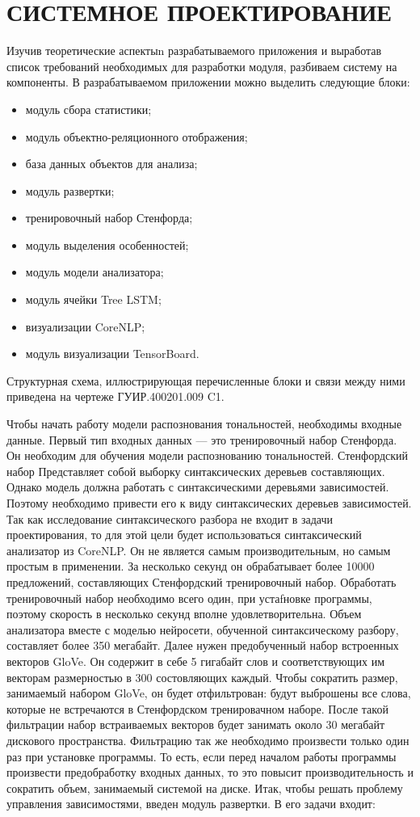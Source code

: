 \section{СИСТЕМНОЕ ПРОЕКТИРОВАНИЕ}\label{sec:sys}
Изучив теоретические аспектыn разрабатываемого приложения и выработав список требований необходимых для разработки модуля, разбиваем систему на компоненты.
В разрабатываемом приложении можно выделить следующие блоки:
\begin{itemize}
\item модуль сбора статистики;
\item модуль объектно-реляционного отображения;
\item база данных объектов для анализа;
\item модуль развертки;
\item тренировочный набор Стенфорда;
\item модуль выделения особенностей;
\item модуль модели анализатора;
\item модуль ячейки Tree LSTM\@;
\item визуализации CoreNLP\@;
\item модуль визуализации TensorBoard.
\end{itemize}
Структурная схема, иллюстрирующая перечисленные блоки и связи между ними приведена на чертеже ГУИР.400201.009 C1.

Чтобы начать работу модели распознования тональностей, необходимы входные данные. Первый тип входных данных --- это тренировочный набор Стенфорда. Он необходим для обучения модели распознованию тональностей. Стенфордский набор Представляет собой выборку синтаксических деревьев составляющих. Однако модель должна работать с синтаксическими деревьями зависимостей. Поэтому необходимо привести его к виду синтаксических деревьев зависимостей. Так как исследование синтаксического разбора не входит в задачи проектирования, то для этой цели будет использоваться синтаксический анализатор из CoreNLP\@. Он не является самым производительным, но самым простым в применении. За несколько секунд он обрабатывает более 10000 предложений, составляющих Стенфордский тренировочный набор. Обработать тренировочный набор необходимо всего один, при устаfновке программы, поэтому скорость в несколько секунд вполне удовлетворительна. Объем анализатора вместе с моделью нейросети, обученной синтаксическому разбору, составляет более 350 мегабайт. Далее нужен предобученный набор встроенных векторов GloVe\@. Он содержит в себе 5 гигабайт слов и соответствующих им векторам размерностью в 300 состовляющих каждый. Чтобы сократить размер, занимаемый набором GloVe\@, он будет отфильтрован: будут выброшены все слова, которые не встречаются в Стенфордском тренировачном наборе. После такой фильтрации набор встраиваемых векторов будет занимать около 30 мегабайт дискового пространства. Фильтрацию так же необходимо произвести только один раз при установке программы. То есть, если перед началом работы программы произвести предобработку входных данных, то это повысит производительность и сократить объем, занимаемый системой на диске. Итак, чтобы решать проблему управления зависимостями, введен модуль развертки. В его задачи входит:

